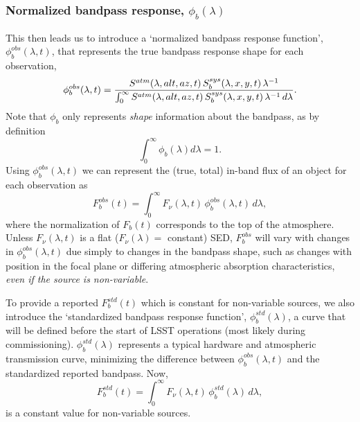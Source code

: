 \documentclass[12pt,preprint]{aastex}
\begin{document}
\subsubsection{Normalized bandpass response, $\phi_b(\lambda)$}
\label{sec:phi}

This then leads us to introduce a `normalized bandpass response
function', $\phi_b^{obs}(\lambda,t)$, that represents the true
bandpass response shape for each observation,
\begin{equation}
\label{eqn:PhiDef}
   \phi_b^{obs}(\lambda,t) =  {
     {S^{atm}(\lambda,alt,az,t)\, S_b^{sys}(\lambda,x,y,t) \,
       \lambda^{-1}} \over
     \int_0^\infty { {S^{atm}(\lambda,alt,az,t) \,
         S_b^{sys}(\lambda,x,y,t) \, \lambda^{-1}} \,d\lambda}}.
\end{equation}
Note that $\phi_b$ only represents {\it shape} information about the
bandpass, as by definition
\begin{equation}
\int_0^\infty {\phi_b(\lambda)  d\lambda}=1. 
\end{equation}
Using $\phi_b^{obs}(\lambda, t)$ we can represent the (true, total)
in-band flux of an object for each observation as
\begin{equation}
\label{eqn:Fb}
F_b^{obs}(t) = \int_0^\infty {F_\nu(\lambda,t) \,\phi_b^{obs}(\lambda,t) \, d\lambda},
\end{equation}
where the normalization of $F_b(t)$ corresponds to the top of the
atmosphere. Unless $F_\nu(\lambda,t)$ is a flat ($F_\nu(\lambda)=$
constant) SED, $F_b^{obs}$ will vary with changes in
$\phi_b^{obs}(\lambda,t)$ due simply to changes in the bandpass shape,
such as changes with position in the focal plane or differing
atmospheric absorption characteristics, {\it even if the source is
non-variable}.

To provide a reported $F_b^{std}(t)$ which is constant for
non-variable sources, we also introduce the `standardized bandpass response
function', $\phi_b^{std}(\lambda)$, a curve that will be defined before
the start of LSST operations (most likely during
commissioning). $\phi_b^{std}(\lambda)$ represents a typical hardware
and atmospheric transmission curve, minimizing the difference between
$\phi_b^{obs}(\lambda,t)$ and the standardized reported bandpass.
Now, 
\begin{equation}
\label{eqn:stdFlux}
F_b^{std}(t) = \int_0^{\infty} {F_\nu(\lambda,t) \,
  \phi_b^{std}(\lambda) \, d\lambda}, 
\end{equation}
is a constant value for non-variable sources. 
\end{document}
